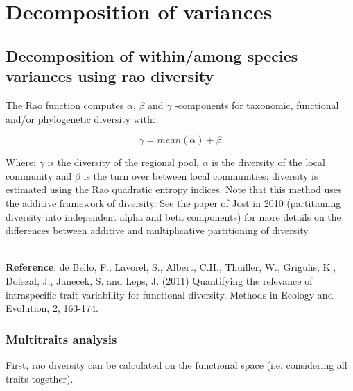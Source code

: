 \documentclass[12pt]{article}\usepackage[]{graphicx}\usepackage[]{color}
\begin{document}
\section{Decomposition of variances}

\subsection{Decomposition of within/among species variances using rao diversity}

The Rao function computes $\alpha$, $\beta$ and $\gamma$ -components for taxonomic, functional and/or phylogenetic diversity with:

$$ \gamma = mean (\alpha) + \beta $$


Where: $\gamma$ is the diversity of the regional pool, $\alpha$ is the diversity of the local community and $\beta$ is the turn over between local communities; diversity is estimated using the Rao quadratic entropy indices. Note that this method uses the additive framework of diversity. See the paper of Jost in 2010 (partitioning diversity into independent alpha and beta components) for more details on the differences between additive and multiplicative partitioning of diversity.

\\

\textbf{Reference}: de Bello, F., Lavorel, S., Albert, C.H., Thuiller, W., Grigulis, K., Dolezal, J., Janecek, S. and Leps, J. (2011) Quantifying the relevance of intraspecific trait variability for functional diversity. Methods in Ecology and Evolution, 2, 163-174.


\subsubsection{Multitraits analysis}
First, rao diversity can be calculated on the functional  space (i.e. considering all traits together).
\end{document}
